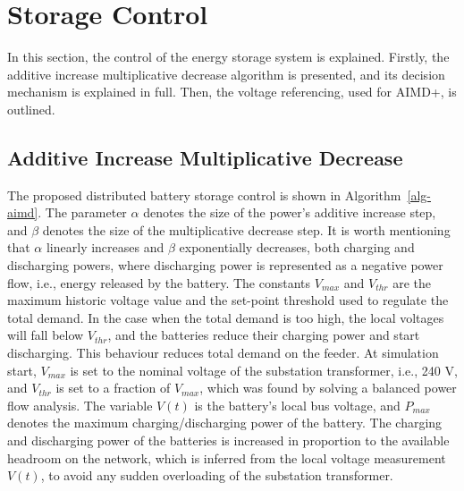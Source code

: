 \section{Storage Control}
\label{ch4:sec:storage-control}

In this section, the control of the energy storage system is explained. Firstly, the additive increase multiplicative decrease algorithm is presented, and its decision mechanism is explained in full. Then, the voltage referencing, used for AIMD+, is outlined.

\subsection{Additive Increase Multiplicative Decrease}

The proposed distributed battery storage control is shown in Algorithm~\ref{alg-aimd}. The parameter $\alpha$ denotes the size of the power's additive increase step, and $\beta$ denotes the size of the multiplicative decrease step. It is worth mentioning that $\alpha$ linearly increases and $\beta$ exponentially decreases, both charging and discharging powers, where discharging power is represented as a negative power flow, i.e., energy released by the battery. The constants $V_{max}$ and $V_{thr}$ are the maximum historic voltage value and the set-point threshold used to regulate the total demand. In the case when the total demand is too high, the local voltages will fall below $V_{thr}$, and the batteries reduce their charging power and start discharging. This behaviour reduces total demand on the feeder. At simulation start, $V_{max}$ is set to the nominal voltage of the substation transformer, i.e., 240 V, and $V_{thr}$ is set to a fraction of $V_{max}$, which was found by solving a balanced power flow analysis. The variable $V(t)$ is the battery's local bus voltage, and $P_{max}$ denotes the maximum charging/discharging power of the battery. The charging and discharging power of the batteries is increased in proportion to the available headroom on the network, which is inferred from the local voltage measurement $V(t)$, to avoid any sudden overloading of the substation transformer.

